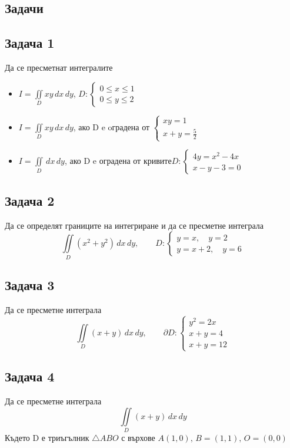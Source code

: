 \documentclass[a4paper,fleqn,12pt]{article}
\theoremstyle{definition}
\begin{document}
\subsection{Задачи}

\subsection*{Задача 1}
Да се пресметнат интегралите
\begin{itemize}
\item $I = \iint\limits_D xy \,dx \,dy$, $D: \begin{cases} 0 \leq x \leq 1 \\ 0 \leq y \leq 2 \end{cases}$
\item $I = \iint\limits _D xy \,dx \,dy$, ако D e oградена от $\begin{cases} xy = 1 \\ x+y = \frac{5}{2} \end{cases}$
\item $I = \iint\limits _D \,dx \,dy$, ако D e оградена от кривите$D: \begin{cases} 4y = x^2 - 4x \\ x - y - 3 = 0 \end{cases}$
\end{itemize}

\subsection*{Задача 2}
Да се определят границите на интегриране и да се пресметне интеграла
$$\iint\limits_D (x^2 + y^2) \, dx \, dy, \qquad D: \begin{cases} y = x , \quad y =2 \\ y = x + 2, \quad y = 6 \end{cases}$$

\subsection*{Задача 3}
Да се пресметне интеграла
$$\iint\limits_D (x+y) \, dx \, dy, \qquad \partial D: \begin{cases} y^2 = 2x \\ x+y = 4 \\ x+y = 12 \end{cases}$$

\subsection*{Задача 4}
Да се пресметне интеграла
$$\iint\limits_D (x+y) \, dx \, dy$$
Където D е триъгълник $\triangle ABO$ с върхове $A(1,0),\, B = (1,1),\, O = (0,0)$
\end{document}
